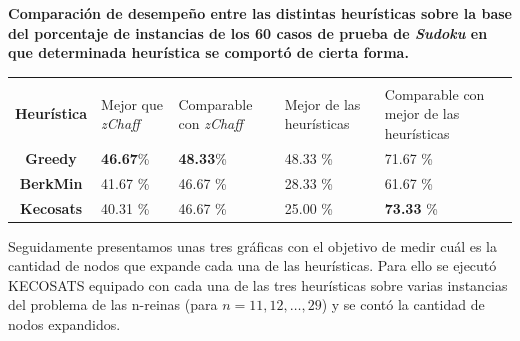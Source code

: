 \documentclass[12pt,lettersize,oneside]{article}
\begin{document}



\begin{center}
  \textbf{Comparación de desempeño entre las distintas heurísticas sobre la base
    del porcentaje de instancias de los 60 casos de prueba de \emph{Sudoku} en
    que determinada heurística se comportó de cierta forma. }
\end{center}
\begin{center}
\begin{tabular}{c|p{2cm}p{2cm}p{2cm}p{2.5cm}}
\hline\\\textbf{Heurística} & Mejor que \emph{zChaff} & Comparable con \emph{zChaff} & Mejor de las heurísticas & Comparable con mejor de las heurísticas \\\hline
\textbf{Greedy}     &   \textbf{46.67}\%          &  \textbf{48.33}\%   &  48.33   \%       & 71.67  \%\\
\textbf{BerkMin}    &   41.67         \% &  46.67                  \% &   28.33    \%     & 61.67 \%\\
\textbf{Kecosats}   &  40.31          \% &  46.67                  \% &    25.00
\%      & \textbf{73.33} \% \\\hline

\end{tabular}
\end{center}

Seguidamente presentamos unas tres gráficas con el objetivo de medir cuál es la cantidad de nodos que expande cada una de las heurísticas. Para ello se ejecutó KECOSATS equipado con cada una de las tres heurísticas sobre varias instancias del problema de las n-reinas (para $n=11,12,\ldots,29$) y se contó la cantidad de nodos expandidos.
\end{document}
